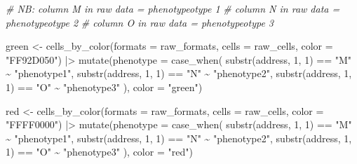 \documentclass[
]{book}
\newenvironment{Shaded}{\begin{snugshade}}{\end{snugshade}}
\newcommand{\AttributeTok}[1]{\textcolor[rgb]{0.77,0.63,0.00}{#1}}
\newcommand{\CommentTok}[1]{\textcolor[rgb]{0.56,0.35,0.01}{\textit{#1}}}
\newcommand{\DecValTok}[1]{\textcolor[rgb]{0.00,0.00,0.81}{#1}}
\newcommand{\FunctionTok}[1]{\textcolor[rgb]{0.00,0.00,0.00}{#1}}
\newcommand{\NormalTok}[1]{#1}
\newcommand{\OtherTok}[1]{\textcolor[rgb]{0.56,0.35,0.01}{#1}}
\newcommand{\SpecialCharTok}[1]{\textcolor[rgb]{0.00,0.00,0.00}{#1}}
\newcommand{\StringTok}[1]{\textcolor[rgb]{0.31,0.60,0.02}{#1}}
\begin{document}
\begin{Shaded}
\begin{Highlighting}[]
\CommentTok{\# NB: column M in raw data = phenotypeotype 1}
\CommentTok{\# column N in raw data = phenotypeotype 2}
\CommentTok{\# column O in raw data = phenotypeotype 3}

\NormalTok{green }\OtherTok{\textless{}{-}} \FunctionTok{cells\_by\_color}\NormalTok{(}\AttributeTok{formats =}\NormalTok{ raw\_formats,}
                        \AttributeTok{cells =}\NormalTok{ raw\_cells,}
                        \AttributeTok{color =} \StringTok{"FF92D050"}\NormalTok{) }\SpecialCharTok{|\textgreater{}} 
  \FunctionTok{mutate}\NormalTok{(}\AttributeTok{phenotype =} \FunctionTok{case\_when}\NormalTok{(}
    \FunctionTok{substr}\NormalTok{(address, }\DecValTok{1}\NormalTok{, }\DecValTok{1}\NormalTok{) }\SpecialCharTok{==} \StringTok{"M"} \SpecialCharTok{\textasciitilde{}} \StringTok{"phenotype1"}\NormalTok{,}
    \FunctionTok{substr}\NormalTok{(address, }\DecValTok{1}\NormalTok{, }\DecValTok{1}\NormalTok{) }\SpecialCharTok{==} \StringTok{"N"} \SpecialCharTok{\textasciitilde{}} \StringTok{"phenotype2"}\NormalTok{,}
    \FunctionTok{substr}\NormalTok{(address, }\DecValTok{1}\NormalTok{, }\DecValTok{1}\NormalTok{) }\SpecialCharTok{==} \StringTok{"O"} \SpecialCharTok{\textasciitilde{}} \StringTok{"phenotype3"}
\NormalTok{  ),}
  \AttributeTok{color =} \StringTok{"green"}\NormalTok{)}

\NormalTok{red }\OtherTok{\textless{}{-}} \FunctionTok{cells\_by\_color}\NormalTok{(}\AttributeTok{formats =}\NormalTok{ raw\_formats,}
                      \AttributeTok{cells =}\NormalTok{ raw\_cells,}
                      \AttributeTok{color =} \StringTok{"FFFF0000"}\NormalTok{) }\SpecialCharTok{|\textgreater{}}
  \FunctionTok{mutate}\NormalTok{(}\AttributeTok{phenotype =} \FunctionTok{case\_when}\NormalTok{(}
    \FunctionTok{substr}\NormalTok{(address, }\DecValTok{1}\NormalTok{, }\DecValTok{1}\NormalTok{) }\SpecialCharTok{==} \StringTok{"M"} \SpecialCharTok{\textasciitilde{}} \StringTok{"phenotype1"}\NormalTok{,}
    \FunctionTok{substr}\NormalTok{(address, }\DecValTok{1}\NormalTok{, }\DecValTok{1}\NormalTok{) }\SpecialCharTok{==} \StringTok{"N"} \SpecialCharTok{\textasciitilde{}} \StringTok{"phenotype2"}\NormalTok{,}
    \FunctionTok{substr}\NormalTok{(address, }\DecValTok{1}\NormalTok{, }\DecValTok{1}\NormalTok{) }\SpecialCharTok{==} \StringTok{"O"} \SpecialCharTok{\textasciitilde{}} \StringTok{"phenotype3"}
\NormalTok{  ),}
  \AttributeTok{color =} \StringTok{"red"}\NormalTok{)}



\end{Highlighting}
\end{Shaded}
\end{document}
